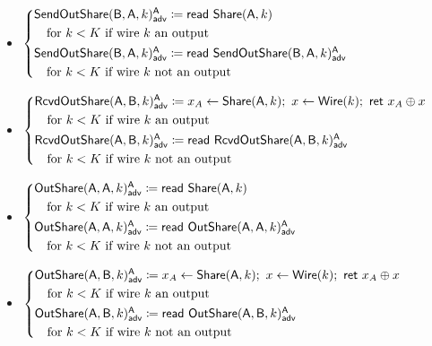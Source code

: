 \begin{itemize}
\item {\color{blue} $\begin{cases*} \LeakSendOutShare(\B,\A,k)^\A_\adv \coloneqq \read{\Share(\A,k)} \\ \hspace{10pt} \text{for $k < K$ if wire $k$ an output} \\ \LeakSendOutShare(\B,\A,k)^\A_\adv \coloneqq \read{\LeakSendOutShare(\B,\A,k)^\A_\adv} \\ \hspace{10pt} \text{for $k < K$ if wire $k$ not an output} \end{cases*}$}
\item {\color{blue} $\begin{cases*} \LeakRcvdOutShare(\A,\B,k)^\A_\adv \coloneqq x_A \leftarrow \Share(\A,k); \ x \leftarrow \Wire(k); \ \ret{x_A \oplus x} \\ \hspace{10pt} \text{for $k < K$ if wire $k$ an output} \\ \LeakRcvdOutShare(\A,\B,k)^\A_\adv \coloneqq \read{\LeakRcvdOutShare(\A,\B,k)^\A_\adv} \\ \hspace{10pt} \text{for $k < K$ if wire $k$ not an output} \end{cases*}$}
\item {\color{blue} $\begin{cases*} \LeakOutShare(\A,\A,k)^\A_\adv \coloneqq \read{\Share(\A,k)} \\ \hspace{10pt} \text{for $k < K$ if wire $k$ an output} \\ \LeakOutShare(\A,\A,k)^\A_\adv \coloneqq \read{\LeakOutShare(\A,\A,k)^\A_\adv} \\ \hspace{10pt} \text{for $k < K$ if wire $k$ not an output} \end{cases*}$}
\item {\color{blue} $\begin{cases*} \LeakOutShare(\A,\B,k)^\A_\adv \coloneqq x_A \leftarrow \Share(\A,k); \ x \leftarrow \Wire(k); \ \ret{x_A \oplus x} \\ \hspace{10pt} \text{for $k < K$ if wire $k$ an output} \\ \LeakOutShare(\A,\B,k)^\A_\adv \coloneqq \read{\LeakOutShare(\A,\B,k)^\A_\adv} \\ \hspace{10pt} \text{for $k < K$ if wire $k$ not an output} \end{cases*}$}

\end{itemize}
